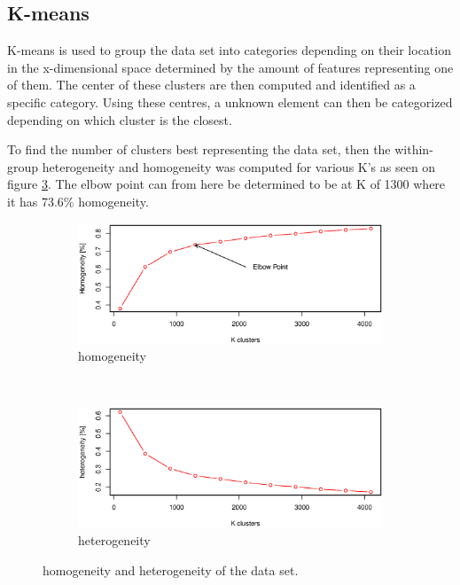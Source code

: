 \subsection{K-means}
K-means is used to group the data set into categories depending on their location in the x-dimensional space determined by the amount of features representing one of them.
The center of these clusters are then computed and identified as a specific category.
Using these centres, a unknown element can then be categorized depending on which cluster is the closest.

To find the number of clusters best representing the data set, then the within-group heterogeneity and homogeneity was computed for various K's as seen on figure \ref{fig:elbow_point}.
The elbow point can from here be determined to be at K of 1300 where it has 73.6\% homogeneity.


\begin{figure}[H]
\centering
\begin{subfigure}{0.70\textwidth}
\centering
\includegraphics[width=\textwidth]{graphics/homogenity}
\caption{homogeneity}
\label{fig:homogeneity_kmean}
\end{subfigure}\\[-1cm]
\begin{subfigure}{0.70\textwidth}
\centering
\includegraphics[width=\textwidth]{graphics/heterogenity}
\caption{heterogeneity}
\label{fig:heterogeneity_kmean}
\end{subfigure}
\caption[K means elbow point]{homogeneity and heterogeneity of the data set.}
\label{fig:elbow_point}
\end{figure}


